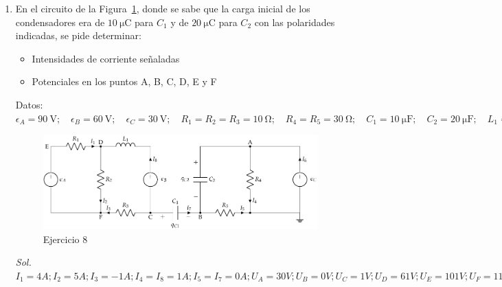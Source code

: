 \begin{enumerate}
\item En el circuito de la Figura~\ref{fig.ej10_BT1}, donde se sabe que la carga inicial de los condensadores era de $\qty{10}{\micro\coulomb}$ para $C_1$ y de $\qty{20}{\micro\coulomb}$ para $C_2$ con las polaridades indicadas, se pide determinar:
\begin{itemize}
    \item Intensidades de corriente señaladas
    \item Potenciales en los puntos A, B, C, D, E y F
\end{itemize}

Datos: $\epsilon_{A}=\SI{90}{\volt};\quad    \epsilon_{B}=\SI{60}{\volt};\quad    \epsilon_{C}=\SI{30}{\volt};\quad    R_{1}= R_2 = R_3 = \SI{10}{\ohm};\quad    R_{4}= R_5 = \SI{30}{\ohm};\quad    C_{1}= \SI{10}{\micro\farad};\quad    C_{2}= \SI{20}{\micro\farad};\quad    L_1 = \SI{1}{\micro\henry}$

\begin{figure}[H]
  \centering
  \includegraphics[scale = 0.8]{../figs/mallas_carga_inicial.pdf}
    \caption{Ejercicio 8}
    \label{fig.ej10_BT1}
\end{figure}

\emph{Sol. $I_1=4A; I_2=5A; I_3=-1A;I_4=I_8=1A; I_5=I_7=0A; U_A=30V; U_B=0V; U_C=1V; U_D=61V;U_E=101V; U_F=11V$}


\end{enumerate}

